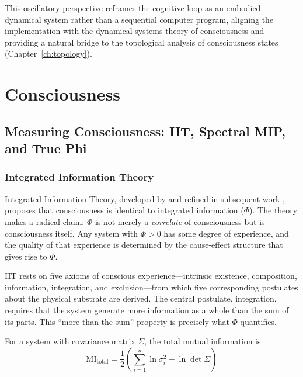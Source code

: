 \documentclass[12pt]{book}
\begin{document}
This oscillatory perspective reframes the cognitive loop as an embodied dynamical system rather than a sequential computer program, aligning the implementation with the dynamical systems theory of consciousness and providing a natural bridge to the topological analysis of consciousness states (Chapter~\ref{ch:topology}).



\part{Consciousness}

\chapter{Measuring Consciousness: IIT, Spectral MIP, and True Phi}
\label{ch:phi}

\section{Integrated Information Theory}

Integrated Information Theory, developed by \citet{tononi2004information} and refined in subsequent work \citep{oizumi2014phenomenology, tononi2015integrated}, proposes that consciousness is identical to integrated information ($\Phi$). The theory makes a radical claim: $\Phi$ is not merely a \textit{correlate} of consciousness but is consciousness itself. Any system with $\Phi > 0$ has some degree of experience, and the quality of that experience is determined by the cause-effect structure that gives rise to $\Phi$.

IIT rests on five axioms of conscious experience---intrinsic existence, composition, information, integration, and exclusion---from which five corresponding postulates about the physical substrate are derived. The central postulate, integration, requires that the system generate more information as a whole than the sum of its parts. This ``more than the sum'' property is precisely what $\Phi$ quantifies.

For a system with covariance matrix $\Sigma$, the total mutual information is:
\begin{equation}\label{eq:mi-total}
\text{MI}_{\text{total}} = \frac{1}{2}\left(\sum_{i=1}^{n} \ln \sigma_i^2 - \ln \det \Sigma\right)
\end{equation}
\end{document}
